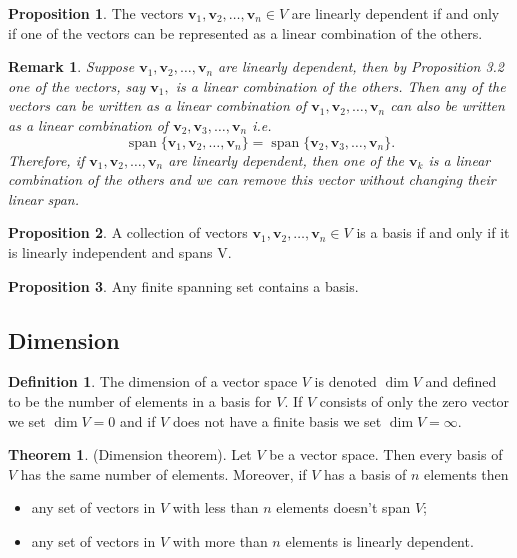 \documentclass[12pt, a4paper]{article}
\newtheorem*{remark}{Remark}
\theoremstyle{definition}
\newtheorem{definition}{Definition}[section]
\newtheorem{theorem}{Theorem}[section]
\newtheorem{proposition}{Proposition}
\theoremstyle{plain}
\newcommand{\vect}[1]{\mathbf{#1}}
\DeclareMathOperator{\Span}{span}
\begin{document}
\begin{proposition} The vectors $\vect{v}_1,\vect{v}_2,\ldots,\vect{v}_n \in V$ are linearly dependent if and only if one of the vectors can be represented as a linear combination of the others. \end{proposition}

\begin{remark}
Suppose $\vect{v}_1,\vect{v}_2,\ldots,\vect{v}_n$ are linearly dependent, then by Proposition 3.2 one of the vectors, say $\vect{v}_1,$ is a linear combination of the others. Then any of the vectors can be written as a linear combination of $\vect{v}_1,\vect{v}_2,\ldots,\vect{v}_n$ can also be written as a linear combination of $\vect{v}_2,\vect{v}_3,\ldots,\vect{v}_n$ i.e. $$\Span\{\vect{v}_1,\vect{v}_2,\ldots,\vect{v}_n\}=\Span\{\vect{v}_2,\vect{v}_3,\ldots,\vect{v}_n\}.$$ Therefore, if $\vect{v}_1,\vect{v}_2,\ldots,\vect{v}_n$ are linearly dependent, then one of the $\vect{v}_k$ is a linear combination of the others and we can remove this vector without changing their linear span.
\end{remark} 

\begin{proposition} A collection of vectors $\vect{v}_1,\vect{v}_2,\ldots,\vect{v}_n \in V$ is a basis if and only if it is linearly independent and spans V. \end{proposition}

\begin{proposition} Any finite spanning set contains a basis. \end{proposition}

\subsection{Dimension}

\begin{definition} The dimension of a vector space $V$ is denoted $\dim{V}$ and defined to be the number of elements in a basis for $V.$ If $V$ consists of only the zero vector we set $\dim{V}=0$ and if $V$ does not have a finite basis we set $\dim{V}=\infty.$ \end{definition}

\begin{theorem}(Dimension theorem). Let $V$ be a vector space. Then every basis of $V$ has the same number of elements. Moreover, if $V$ has a basis of $n$ elements then 
\begin{itemize}

	\item any set of vectors in $V$ with less than $n$ elements doesn't span $V$;

	\item any set of vectors in $V$ with more than $n$ elements is linearly dependent.
\end{itemize}
\end{theorem}
\end{document}
